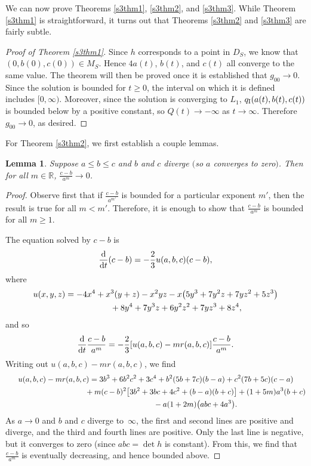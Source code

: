 \documentclass[pdftex]{sigma}
\numberwithin{equation}{section}
\newtheorem{Lemma}[Theorem]{Lemma}
\newcommand{\dtime}{\frac{{\rm d}}{{\rm d} t}} %
\begin{document}
We can now prove Theorems \ref{s3thm1}, \ref{s3thm2}, and \ref{s3thm3}. While Theorem \ref{s3thm1} is straightforward, it turns out that Theorems \ref{s3thm2} and \ref{s3thm3} are fairly subtle.

\begin{proof}[Proof of Theorem \ref{s3thm1}]
Since $h$ corresponds to a point in $D_S$, we know that $(0, b(0), c(0)) \in M_S$. Hence $4a(t)$, $b(t)$, and $c(t)$ all converge to the same value. The theorem will then be proved once it is established that $g_{00} \rightarrow 0$. Since the solution is bounded for $t \geq 0$, the interval on which it is defined includes $[0, \infty)$. Moreover, since the solution is converging to $L_1$, $q_{\rm I}(a(t), b(t), c(t))$ is bounded below by a positive constant, so $Q(t) \rightarrow -\infty$ as $t \rightarrow \infty$. Therefore $g_{00} \rightarrow 0$, as desired.
\end{proof}

For Theorem \ref{s3thm2}, we first establish a couple lemmas.

\begin{Lemma} \label{s3azerobcinfinitylemma1}
Suppose $a \leq b \leq c$ and $b$ and $c$ diverge $($so $a$ converges to zero$)$. Then for all $m \in \mathbb{R}$, $\frac{c - b}{a^m} \rightarrow 0$.
\end{Lemma}

\begin{proof}
Observe first that if $\frac{c - b}{a^{m'}}$ is bounded for a particular exponent $m'$, then the result is true for all $m < m'$. Therefore, it is enough to show that $\frac{c - b}{a^{m}}$ is bounded for all $m \geq 1$.

The equation solved by $c - b$ is
\[
\dtime(c - b) = -\frac{2}{3} u(a, b, c)(c - b),
\]
where
\begin{gather*}
u(x, y, z) = -4x^4 + x^3(y + z) - x^2yz -x\big(5y^3 + 7y^2 z + 7yz^2 + 5z^3\big) \\
\hphantom{u(x, y, z) =}{} + 8y^4 + 7y^3z + 6y^2z^2 + 7yz^3 + 8z^4,
\end{gather*}
and so
\[
\dtime \frac{c - b}{a^m} = -\frac{2}{3} [u(a, b, c) - m r(a, b, c)] \frac{c-b}{a^m}.
\]
Writing out $u(a, b, c) - m r(a, b, c)$, we find
\begin{gather*}
u(a, b, c) - m r(a, b, c) = 3b^3 + 6b^2 c^2 + 3c^4
					 + b^2(5b + 7c)(b - a) + c^2(7b + 5c)(c - a) \\
\hphantom{u(a, b, c) - m r(a, b, c) =}{} + m(c - b)^2\big[3b^2 + 3bc + 4c^2 + (b-a)(b+c)\big]
					 + (1+5m)a^3(b+c) \\
\hphantom{u(a, b, c) - m r(a, b, c) =}{} - a(1+2m)\big(abc + 4a^3\big).
\end{gather*}
As $a \rightarrow 0$ and $b$ and $c$ diverge to~$\infty$, the first and second lines are positive and diverge, and the third and fourth lines are positive. Only the last line is negative, but it converges to zero (since $abc = \det h$ is constant). From this, we find that $\frac{c - b}{a^m}$ is eventually decreasing, and hence bounded above.
\end{proof}
\end{document}
